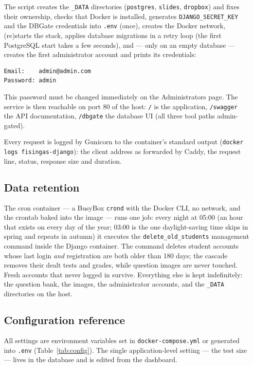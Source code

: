 \documentclass[11pt,a4paper]{article}
\newcommand{\code}[1]{\texttt{#1}}
\begin{document}
The script creates the \code{\_DATA} directories (\code{postgres},
\code{slides}, \code{dropbox}) and fixes their ownership, checks that
Docker is installed, generates \code{DJANGO\_SECRET\_KEY} and the
DBGate credentials into \code{.env} (once), creates the Docker
network, (re)starts the stack, applies database migrations in a retry
loop (the first PostgreSQL start takes a few seconds), and --- only on
an empty database --- creates the first administrator account and
prints its credentials:

\begin{lstlisting}
Email:    admin@admin.com
Password: admin
\end{lstlisting}

This password must be changed immediately on the Administrators page.
The service is then reachable on port 80 of the host: \code{/} is the
application, \code{/swagger} the API documentation, \code{/dbgate}
the database UI (all three tool paths admin-gated).

Every request is logged by Gunicorn to the container's standard output
(\code{docker logs fisingas-django}): the client address as forwarded
by Caddy, the request line, status, response size and duration.

\subsection{Data retention}

The cron container --- a BusyBox \code{crond} with the Docker CLI, no
network, and the crontab baked into the image --- runs one job: every
night at 05:00 (an hour that exists on every day of the year; 03:00 is
the one daylight-saving time skips in spring and repeats in autumn) it
executes the \code{delete\_old\_students} management command inside
the Django container. The command deletes student
accounts whose last login \emph{and} registration are both older than
180 days; the cascade removes their dealt tests and grades, while
question images are never touched. Fresh accounts that never logged in
survive. Everything else is kept indefinitely: the question bank, the
images, the administrator accounts, and the \code{\_DATA} directories
on the host.

\subsection{Configuration reference}

All settings are environment variables set in
\code{docker-compose.yml} or generated into \code{.env}
(Table~\ref{tab:config}). The single application-level setting --- the
test size --- lives in the database and is edited from the dashboard.
\end{document}
